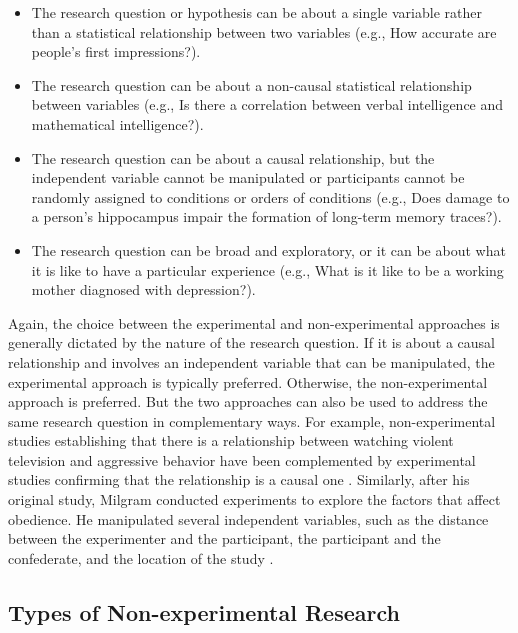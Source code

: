 \begin{itemize}

\item The research question or hypothesis can be about a single variable rather than a statistical relationship between two variables (e.g., How accurate are people's first impressions?).

\item The research question can be about a non-causal statistical relationship between variables (e.g., Is there a correlation between verbal intelligence and mathematical intelligence?).

\item The research question can be about a causal relationship, but the independent variable cannot be manipulated or participants cannot be randomly assigned to conditions or orders of conditions (e.g., Does damage to a person's hippocampus impair the formation of long-term memory traces?).

\item The research question can be broad and exploratory, or it can be about what it is like to have a particular experience (e.g., What is it like to be a working mother diagnosed with depression?).

\end{itemize}

Again, the choice between the experimental and non-experimental approaches is generally dictated by the nature of the research question. If it is about a causal relationship and involves an independent variable that can be manipulated, the experimental approach is typically preferred. Otherwise, the non-experimental approach is preferred. But the two approaches can also be used to address the same research question in complementary ways. For example, non-experimental studies establishing that there is a relationship between watching violent television and aggressive behavior have been complemented by experimental studies confirming that the relationship is a causal one \citep{bushman_effects_2001}. Similarly, after his original study, Milgram conducted experiments to explore the factors that affect obedience. He manipulated several independent variables, such as the distance between the experimenter and the participant, the participant and the confederate, and the location of the study \cite{milgram_obedience_1974}.

\subsection{Types of Non-experimental Research}

